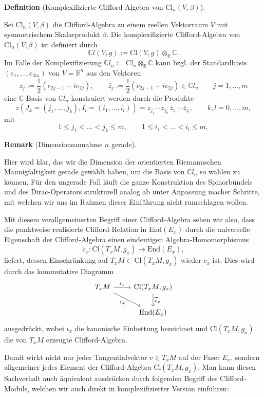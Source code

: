 \documentclass[10pt, letterpaper]{article}
\newcommand{\R}{\mathbb{R}}
\newcommand{\C}{\mathbb{C}}
\newcommand{\End}{\mathrm{End}}
\newcommand{\Cl}{\mathrm{Cl}}
\newcommand{\CustomHeading}[3]{%
  \par\medskip\noindent%
  \textbf{#1 #2} \textnormal{(#3)}.\enskip%
}
\newenvironment{DEF}[2]{\CustomHeading{Definition}{#1}{#2}}{}
\newenvironment{REM}[2]{\CustomHeading{Remark}{#1}{#2}}{}
\begin{document}
\begin{DEF}{}{Komplexifizierte Clifford-Algebra von $\Cl_n(V,\beta)$}
  Sei $\Cl_n(V,\beta)$ die Clifford-Algebra zu einem reellen Vektorraum $V$ mit symmetrischem Skalarprodukt $\beta$. Die komplexifizierte Clifford-Algebra von $\Cl_n(V,\beta)$ ist definiert durch 
  \[
  \C l(V,g):=\Cl(V,g)\otimes_{\R}\C.
  \]
  Im Falle der Komplexifizierung $\C l_n:= \Cl_n\otimes_{\R}\C$ kann bzgl. der Standardbasis $(e_1,…,e_{2m})$ von $V=\R^n$ aus den Vektoren
  \[
  z_j:=\frac12(e_{2j-1}-i e_{2j}),\qquad
  \bar z_j:=\frac12(e_{2j-1}+i e_{2j})\in \C l_n\qquad  j=1,\dots,m
  \] 
  eine $\C$-Basis von $\C l_n$ konstruiert werden durch die Produkte
  \[
  z(J_k=(j_1,…,j_k),I_l=(i_1,…,i_l))=z_{j_1}\cdots z_{j_k}\,\bar z_{i_1}\cdots \bar z_{i_l},
  \qquad k,l=0,\dots,m,
  \]
  mit
  \[
  1\le j_1<\dots<j_k\le m,\qquad 1\le i_1<\dots<i_l\le m,
  \]

\end{DEF}


\begin{REM}{}{Dimensionsannahme $n$ gerade}
Hier wird klar, das wir die Dimension der orientierten Riemannschen Mannigfaltigkeit gerade gewählt haben, um die Basis von $\C l_n$ so wählen zu können. Für den ungerade Fall läuft die ganze Konstruktion des Spinorbündels und des Dirac-Operators strukturell analog ab unter Anpassung macher Schritte, mit welchen wir uns im Rahmen dieser Einführung nicht rumschlagen wollen.
    
\end{REM}

\bigskip 



Mit diesem verallgemeinerten Begriff einer Clifford-Algebra sehen wir also, dass die punktweise realisierte Clifford-Relation in $\End(E_x)$ durch die universelle Eigenschaft der Clifford-Algebra einen eindeutigen Algebra-Homomorphismus
\[
\widetilde c_x:\Cl(T_xM,g_x)\longrightarrow \End(E_x),
\]
liefert, dessen Einschränkung auf \(T_xM\subset \Cl(T_xM,g_x)\) wieder \(c_x\) ist. Dies wird durch das kommutative Diagramm
\[
\begin{tikzcd}
T_xM \arrow[r,"\iota_x"] \arrow[dr,"c_x"'] & \Cl(T_xM,g_x) \arrow[d,"\widetilde c_x"] \\
& \End(E_x)
\end{tikzcd}
\]
ausgedrückt, wobei \(\iota_x\) die kanonische Einbettung bezeichnet und $\Cl(T_xM,g_x)$ die von \(T_xM\) erzeugte Clifford-Algebra.

Damit wirkt nicht nur jeder Tangentialvektor \(v\in T_xM\) auf der Faser \(E_x\), sondern allgemeiner jedes Element der Clifford-Algebra \(\Cl(T_xM,g_x)\). Man kann diesen Sachverhalt auch äquivalent ausdrücken durch folgenden Begriff des Clifford-Moduls, welchen wir auch direkt in komplexifizierter Version einführen:
\end{document}
